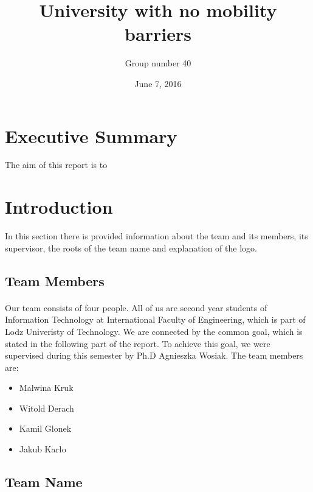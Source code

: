 \documentclass[12pt]{article}
\begin{document}
\begin{titlepage}
\title{University with no mobility barriers}
\date {June 7, 2016}
\author{Group number 40}
\maketitle
{}
\end{titlepage}


\section*{Executive Summary}
The aim of this report is to
\cleardoublepage

\tableofcontents
\thispagestyle{empty}

\newpage

\setcounter{page}{2}
\section{Introduction}
In this section there is provided information about the team and its members, its supervisor, the roots of the team name and explanation of the logo.
\subsection{Team Members}
\paragraph{} Our team consists of four people. All of us are second year students of Information Technology at International Faculty of Engineering, which is part of Lodz Univeristy of Technology.
We are connected by the common goal, which is stated in the following part of the report. To achieve this goal, we were supervised during this semester by Ph.D Agnieszka Wosiak. The team members are:
\begin{itemize}
\item Malwina Kruk
\item Witold Derach
\item Kamil Glonek
\item Jakub Kar\l{}o
\end{itemize}

\subsection{Team Name}
\end{document}
